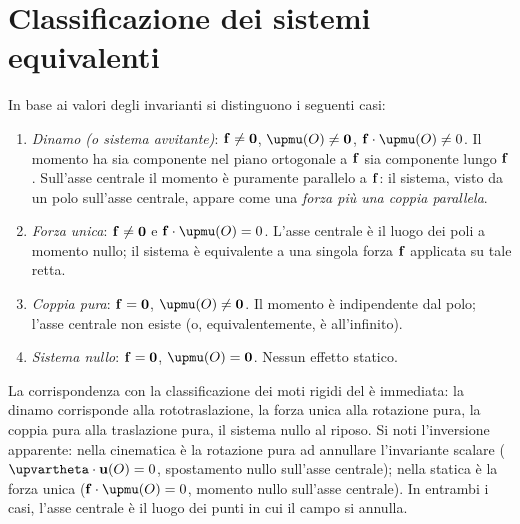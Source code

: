 \section{Classificazione dei sistemi equivalenti}

In base ai valori degli invarianti si distinguono i seguenti
casi:
\begin{enumerate}[label=(\roman*)]
	\item \textit{Dinamo (o sistema avvitante)}:
	$\mathbf{f} \neq \mathbf{0}$,
	$\bm{\upmu}(O) \neq \zerovb$,
	$\fb \cdot \bm{\upmu}(O) \neq 0$. Il momento ha sia
	componente nel piano ortogonale a $\mathbf{f}$ sia componente
	lungo $\mathbf{f}$. Sull'asse centrale il momento è puramente
	parallelo a $\mathbf{f}$: il sistema, visto da un polo sull'asse
	centrale, appare come una \textit{forza più una coppia
		parallela}.
	\item \textit{Forza unica}:
	$\mathbf{f} \neq \mathbf{0}$ e
	$\fb \cdot \bm{\upmu}(O) = 0$. L'asse centrale è il luogo
	dei poli a momento nullo; il sistema è equivalente a una
	singola forza $\mathbf{f}$ applicata su tale retta.
	\item \textit{Coppia pura}:
	$\mathbf{f} = \mathbf{0}$, $\bm{\upmu}(O) \neq \zerovb$. Il momento
	è indipendente dal polo; l'asse centrale non esiste (o,
	equivalentemente, è all'infinito).
	\item \textit{Sistema nullo}: $\mathbf{f} = \mathbf{0}$,
	$\bm{\upmu}(O) = \zerovb$. Nessun effetto statico.
\end{enumerate}

\begin{oss}
	La corrispondenza con la classificazione dei moti rigidi
	del  è immediata: la dinamo corrisponde alla
	rototraslazione, la forza unica alla rotazione pura, la
	coppia pura alla traslazione pura, il sistema nullo al
	riposo. Si noti l'inversione apparente: nella cinematica è
	la rotazione pura ad annullare l'invariante scalare
	($\bm{\upvartheta} \cdot \ub(O) = 0$, spostamento nullo
	sull'asse centrale); nella statica è la forza unica
	($\fb \cdot \bm{\upmu}(O) = 0$, momento nullo sull'asse
	centrale). In entrambi i casi, l'asse centrale è il luogo
	dei punti in cui il campo si annulla.
\end{oss}


